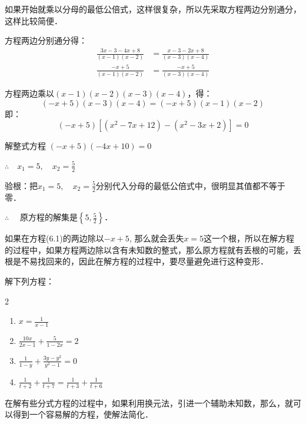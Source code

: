 \begin{analyze}
如果开始就乘以分母的最低公倍式，这样很复杂，所以先采取方程两边分别通分，这样比较简便．
\end{analyze}

\begin{solution}
    方程两边分别通分得：
\[\begin{split}
    \frac{3x-3-4x+8}{(x-1)(x-2)}&=\frac{x-3-2x+8}{(x-3)(x-4)}\\
    \frac{-x+5}{(x-1)(x-2)}&=\frac{-x+5}{(x-3)(x-4)}
\end{split}\]

方程两边乘以$(x-1)(x-2)(x-3)(x-4)$，得：
\begin{equation}
    (-x+5)(x-3)(x-4)=(-x+5)(x-1)(x-2)
\end{equation}
即：
\[(-x+5)[(x^2-7x+12)-(x^2-3x+2)]=0\]

解整式方程 $(-x+5)(-4x+10)=0$

$\therefore\quad x_1=5,\quad x_2=\frac{5}{2}$

验根：把$x_1=5,\quad x_2=\frac{5}{2}$分别代入分母的最低公倍式中，很明显其值都不等于零．

$\therefore\quad $ 原方程的解集是$\left\{5,\frac{5}{2}\right\}$．
\end{solution}

\begin{rmk}
  如果在方程(6.1)的两边除以$-x+5$, 那么就会丢失$x=5$这一个根，所以在解方程的过程中，如果方程两边除以含有未知数的整式，那么原方程就有丢根的可能，丢根是不易找回来的，因此在解方程的过程中，要尽量避免进行这种变形．    
\end{rmk}

\begin{ex}
解下列方程：
\begin{multicols}{2}
    \begin{enumerate}
        \item $x=\frac{1}{x-1}$
        \item $\frac{10x}{2x-1}+\frac{5}{1-2x}=2$
        \item $\frac{1}{1-y}+\frac{3y-y^2}{y^2-1}=0$
        \item $\frac{1}{t+2}+\frac{1}{t+7}=\frac{1}{t+3}+\frac{1}{t+6}$
    \end{enumerate}
\end{multicols}
\end{ex}

在解有些分式方程的过程中，如果利用换元法，引进一个辅助未知数，那么，就可以得到一个容易解的方程，使解法简化．


